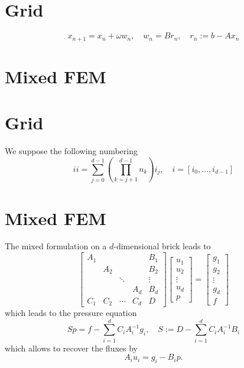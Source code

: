 \documentclass[12pt, english]{article}
\begin{document}
\section{Grid}\label{sec:}
%
%
\begin{equation}\label{eq:}
x_{n+1} = x_n + \omega w_n,\quad  w_n = B r_n, \quad r_n := b - A x_n
\end{equation}
%

%
\section{Mixed FEM}\label{sec:}
%

%
\section{Grid}\label{sec:}
%
We suppose the following numbering
%
\begin{equation}\label{eq:}
ii = \sum_{j=0}^{d-1}\left(\prod_{k=j+1}^{d-1}n_k\right) i_j,\quad i=[i_0,\ldots,i_{d-1}]
\end{equation}
%
%
%
\section{Mixed FEM}\label{sec:}
%
The mixed formulation on a $d$-dimensional brick leads to
%
\begin{equation}\label{eq:structfemsys}
\begin{bmatrix}
A_1 && &  & B_1 \\
 & A_2 &&  & B_2 \\
&&\ddots&&\vdots  \\
& &  &  A_d& B_d \\
C_1 & C_2 &\cdots & C_d & D
\end{bmatrix}
\begin{bmatrix}
  u_1 \\ u_2 \\ \vdots \\ u_d \\ p
\end{bmatrix}
=
\begin{bmatrix}
  g_1 \\ g_2 \\ \vdots \\ g_d \\ f
\end{bmatrix}
\end{equation}
which leads to the pressure equation
\begin{equation}\label{eq:structfemsys}
  S p = f - \sum_{i=1}^d C_i A_i^{-1} g_i,\quad S := D - \sum_{i=1}^d C_i A_i^{-1}B_i
\end{equation}
  which allows to recover the fluxes by
\begin{equation*}
  A_i u_i = g_i  - B_i p.
\end{equation*}
\end{document}

